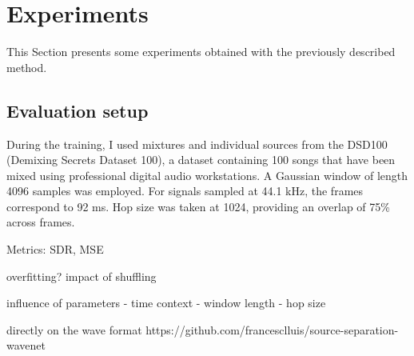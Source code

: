 \section{Experiments}
\label{sec:xp}

This Section presents some experiments obtained with the previously described method.


\subsection{Evaluation setup}

During the training, I used mixtures and individual sources from the
DSD100 (Demixing Secrets Dataset 100), a dataset containing 100 songs that have been mixed using professional digital audio workstations.
A Gaussian window of length 4096 samples was employed. For signals sampled at 44.1 kHz, the frames correspond to 92 ms. Hop size was taken at 1024, providing an overlap of 75\% across frames.

Metrics: SDR, MSE





overfitting?
impact of shuffling


influence of parameters
- time context
- window length
- hop size

directly on the wave format
https://github.com/francesclluis/source-separation-wavenet